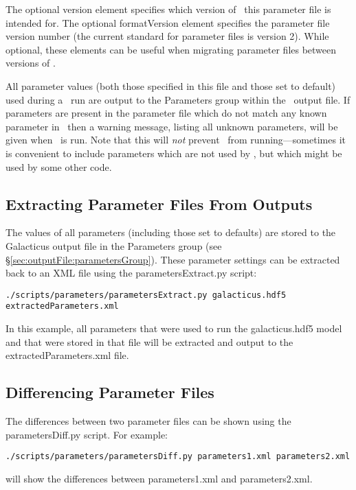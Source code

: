 The optional {\normalfont \ttfamily version} element specifies which version of \glc\ this parameter file is intended for. The optional {\normalfont \ttfamily formatVersion} element specifies the parameter file version number (the current standard for parameter files is version 2). While optional, these elements can be useful when migrating parameter files between versions of \glc.

All parameter values (both those specified in this file and those set to default) used during a \glc\ run are output to the {\normalfont \ttfamily Parameters} group within the \glc\ output file. If parameters are present in the parameter file which do not match any known parameter in \glc\ then a warning message, listing all unknown parameters, will be given when \glc\ is run. Note that this will \emph{not} prevent \glc\ from running---sometimes it is convenient to include parameters which are not used by \glc, but which might be used by some other code.

\subsection{Extracting Parameter Files From Outputs}

The values of all parameters (including those set to defaults) are stored to the Galacticus output file in the {\normalfont \ttfamily Parameters} group (see \S\ref{sec:outputFile:parametersGroup}). These parameter settings can be extracted back to an XML file using the {\normalfont \ttfamily parametersExtract.py} script: 
\begin{verbatim}
./scripts/parameters/parametersExtract.py galacticus.hdf5 extractedParameters.xml
\end{verbatim}
In this example, all parameters that were used to run the {\normalfont \ttfamily galacticus.hdf5} model and that were stored in that file will be extracted and output to the {\normalfont \ttfamily extractedParameters.xml} file.

\subsection{Differencing Parameter Files}

The differences between two parameter files can be shown using the {\normalfont \ttfamily parametersDiff.py} script. For example: 
\begin{verbatim}
./scripts/parameters/parametersDiff.py parameters1.xml parameters2.xml
\end{verbatim}
will show the differences between {\normalfont \ttfamily parameters1.xml} and {\normalfont \ttfamily parameters2.xml}.

